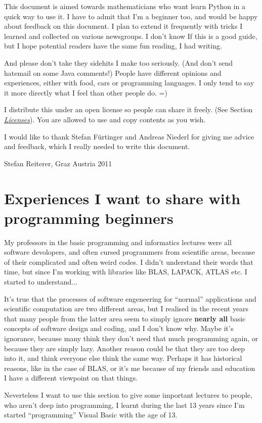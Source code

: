 \documentclass[letterpaper,10pt,english]{manual}
\begin{document}
This document is aimed towards mathematicians who want learn Python in a quick way to use it.
I have to admit that I'm a beginner too, and would be happy about
feedback on this document. I plan to extend it frequently with tricks
I learned and collected on various newsgroups. I don't know If this is
a good guide, but I hope potential readers have the same fun reading,
I had writing.

And please don't take they sidehits I make too seriously.  (And don't send hatemail on some Java comments!)
People have different opinions and experiences, either with food, cars or programming languages. I only tend to say it more
directly what I feel than other people do. =)

I distribute this under an open license so people can share it
freely. (See Section \hyperlink{license-ref}{\emph{Licenses}}). You are allowed to use and
copy contents as you wish.

I would like to thank Stefan Fürtinger and Andreas Niederl for giving
me advice and feedback, which I really needed to write this document.

Stefan Reiterer,
Graz Austria
2011


\section{Experiences I want to share with programming beginners}

My professors in the basic programming and informatics lectures were all software devolopers, and often cursed programmers from scientific areas,
because of their complicated and often weird codes. I didn't understand their words that time, but since I'm working with libraries like
BLAS, LAPACK, ATLAS etc. I started to understand...

It's true that the processes of software engeneering for ``normal'' applications and scientific computation are two different areas, but I realised in the recent
years that many people from the latter area seem to simply ignore \textbf{nearly all} basic concepts of software design and coding, and I don't know why.
Maybe it's ignorance, because many think they don't need that much programming again, or because they are simply lazy. Another reason could be
that they are too deep into it, and think everyone else think the same way. Perhaps it has historical reasons, like in the case of BLAS,
or it's me because of my friends and education I have a different viewpoint on  that things.

Neverteless I want to use this section to give some important lectures to people, who aren't deep into programming,
I learnt during the last 13 years since I'm started ``programming'' Visual Basic with the age of 13.
\end{document}
